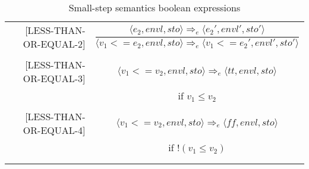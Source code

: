 \begin{longtable}[c] { r c }
  [LESS-THAN-OR-EQUAL-2] & \( 
    \dfrac { \langle e_2, envl, sto \rangle \Rightarrow_e \langle e_2', envl', sto' \rangle }
      { \langle v_1 < = e_2, envl, sto \rangle \Rightarrow_e \langle v_1 < = e_2', envl', sto' \rangle } \)
  \\
  & \\

  [LESS-THAN-OR-EQUAL-3] & \( 
    \langle v_1 < = v_2, envl, sto \rangle \Rightarrow_e \langle tt, envl, sto \rangle \)
  \\
  & if \( v_1 \leq v_2 \) \\
  & \\

  [LESS-THAN-OR-EQUAL-4] & \( 
    \langle v_1 < = v_2, envl, sto \rangle \Rightarrow_e \langle ff, envl, sto \rangle \)
  \\
  & if \( !(v_1 \leq v_2) \) \\
  & \\
  \caption{Small-step semantics boolean expressions}
\end{longtable}